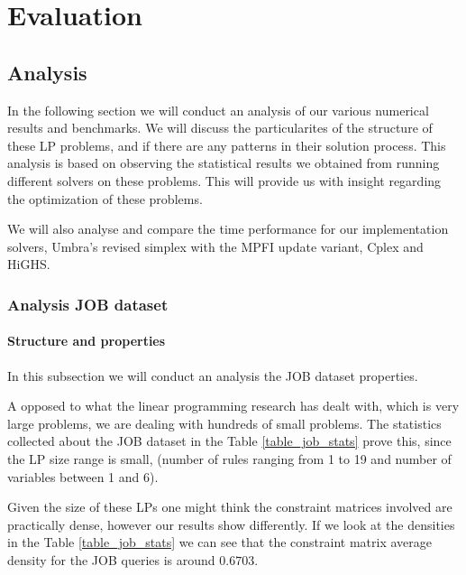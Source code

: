 
\chapter{Evaluation}\label{chapter:evaluation}
\section{Analysis}
In the following section we will conduct an analysis of our various numerical results
and benchmarks.
We will discuss the
particularites of the structure of these LP problems, and if there are any
patterns in their solution
process. This analysis is based on observing the statistical results we obtained from
running different solvers on these problems. This will provide us with insight
regarding the optimization of these problems.

We will also analyse and compare the time performance for our implementation solvers,
Umbra's revised simplex with the MPFI update variant, Cplex and HiGHS.


\subsection{Analysis JOB dataset}

\subsubsection{Structure and properties}
In  this subsection we will conduct an analysis the JOB dataset properties.

A opposed to what the linear programming research has dealt with, which is
very large problems, we are dealing with hundreds of small problems. The statistics
collected about the JOB dataset in the Table \ref{table_job_stats} prove this, since the LP size range is small, (number
of rules ranging from 1 to 19 and number of variables between 1 and 6).

Given the size of these LPs one might think the constraint matrices involved
are practically dense, however our results show differently. If we look at the densities
in the Table \ref{table_job_stats} we can see that the constraint matrix average density
for the JOB queries is around $0.6703$.

